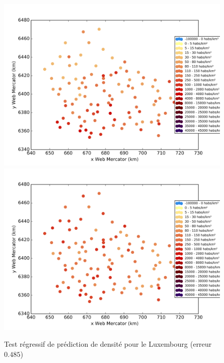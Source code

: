 \documentclass{book}
\begin{document}
\begin{figure}[H]
\begin{center}
\includegraphics[scale=0.5]{images/luxembourg_ground_truth.png}
\includegraphics[scale=0.5]{images/luxembourg_Random_Forest_Regression.png}
\end{center}
\caption{Test régressif de prédiction de densité pour le Luxembourg (erreur $0.485$)}
\label{test_luxembourg}
\end{figure}
\end{document}
